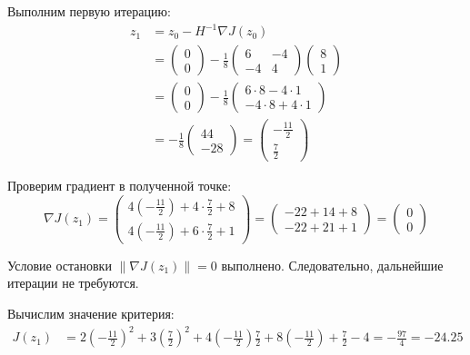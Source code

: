Выполним первую итерацию:
\[
\begin{aligned}
z_1
&=z_0-H^{-1}\nabla J(z_0)\\[1ex]
&=
\begin{pmatrix}
0\\
0
\end{pmatrix}
-\frac18
\begin{pmatrix}
6 & -4\\
-4 & 4
\end{pmatrix}
\begin{pmatrix}
8\\
1
\end{pmatrix}\\[1ex]
&=
\begin{pmatrix}
0\\
0
\end{pmatrix}
-\frac18
\begin{pmatrix}
6\cdot8-4\cdot1\\
-4\cdot8+4\cdot1
\end{pmatrix}\\[1ex]
&=
-\frac18
\begin{pmatrix}
44\\
-28
\end{pmatrix}
=
\begin{pmatrix}
-\frac{11}{2}\\[1ex]
\frac72
\end{pmatrix}
\end{aligned}
\]

Проверим градиент в полученной точке:
\[
\nabla J(z_1)=
\begin{pmatrix}
4\left(-\frac{11}{2}\right)+4\cdot\frac72+8\\[1ex]
4\left(-\frac{11}{2}\right)+6\cdot\frac72+1
\end{pmatrix}
=
\begin{pmatrix}
-22+14+8\\
-22+21+1
\end{pmatrix}
=
\begin{pmatrix}
0\\
0
\end{pmatrix}
\]

Условие остановки \(\|\nabla J(z_1)\|=0\) выполнено.
Следовательно, дальнейшие итерации не требуются.

Вычислим значение критерия:
\[
\begin{aligned}
J(z_1)
&=
2\left(-\frac{11}{2}\right)^2
+3\left(\frac72\right)^2
+4\left(-\frac{11}{2}\right)\frac72
+8\left(-\frac{11}{2}\right)+\frac72-4
=-\frac{97}{4}=-24.25
\end{aligned}
\]

